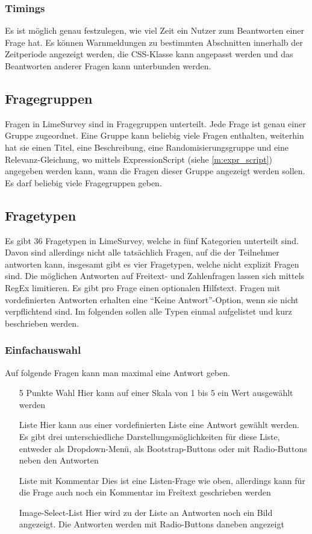 \subsubsection{Timings}

Es ist möglich genau festzulegen, wie viel Zeit ein Nutzer zum Beantworten einer Frage hat.
Es können Warnmeldungen zu bestimmten Abschnitten innerhalb der Zeitperiode angezeigt werden, die CSS-Klasse kann angepasst werden und das Beantworten anderer Fragen kann unterbunden werden.

\subsection{Fragegruppen}

Fragen in LimeSurvey sind in Fragegruppen unterteilt. Jede Frage ist genau einer Gruppe zugeordnet.
Eine Gruppe kann beliebig viele Fragen enthalten, weiterhin hat sie einen Titel, eine Beschreibung, eine Randomisierungsgruppe und eine Relevanz-Gleichung, wo mittels ExpressionScript (siehe \cref{m:expr_script}) angegeben werden kann, wann die Fragen dieser Gruppe angezeigt werden sollen.
Es darf beliebig viele Fragegruppen geben.

\subsection{Fragetypen}

Es gibt 36 Fragetypen in LimeSurvey, welche in fünf Kategorien unterteilt sind.
Davon sind allerdings nicht alle tatsächlich Fragen, auf die der Teilnehmer antworten kann, insgesamt gibt es vier Fragetypen, welche nicht explizit Fragen sind.
Die möglichen Antworten auf Freitext- und Zahlenfragen lassen sich mittels RegEx limitieren.
Es gibt pro Frage einen optionalen Hilfstext.
Fragen mit vordefinierten Antworten erhalten eine \enquote{Keine Antwort}-Option, wenn sie nicht verpflichtend sind.
Im folgenden sollen alle Typen einmal aufgelistet und kurz beschrieben werden.


\subsubsection{Einfachauswahl}

Auf folgende Fragen kann man maximal eine Antwort geben.
\begin{itemize}
	\item[5 Punkte Wahl] Hier kann auf einer Skala von 1 bis 5 ein Wert ausgewählt werden
	\item[Liste] Hier kann aus einer vordefinierten Liste eine Antwort gewählt werden. Es gibt drei unterschiedliche Darstellungsmöglichkeiten für diese Liste, entweder als Dropdown-Menü, als Bootstrap-Buttons oder mit Radio-Buttons neben den Antworten
	\item[Liste mit Kommentar] Dies ist eine Listen-Frage wie oben, allerdings kann für die Frage auch noch ein Kommentar im Freitext geschrieben werden
	\item[Image-Select-List] Hier wird zu der Liste an Antworten noch ein Bild angezeigt. Die Antworten werden mit Radio-Buttons daneben angezeigt
\end{itemize}


